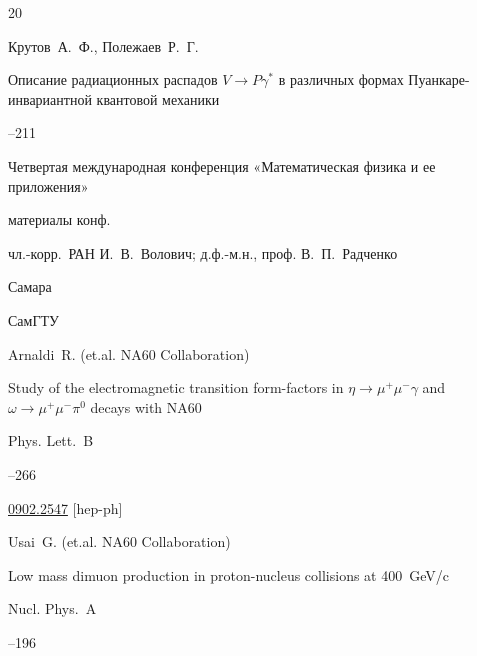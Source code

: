 \begin{thebibliography}{20}




\by  Крутов~А.~Ф., Полежаев~Р.~Г.

\paper Описание радиационных распадов $V \to  P\gamma^{*}$ в различных формах Пуанкаре-инвариантной квантовой механики

--211

\inbook Четвертая международная конференция «Математическая физика и ее приложения»

\bookinfo материалы конф. 

\eds чл.-корр.~РАН И.~В.~Волович; д.ф.-м.н., проф. В.~П.~Радченко

\publaddr Самара

\publ СамГТУ









\by Arnaldi~R. (et.al. NA60 Collaboration)

\paper Study of the electromagnetic transition form-factors in $\eta\to \mu^{+}\mu^{-}\gamma$ and $\omega\to \mu^{+}\mu^{-}\pi^{0}$ decays with NA60

\jour Phys. Lett.~B



--266



\arxiv \href{http://arxiv.org/abs/0902.2547}{0902.2547} [hep-ph]




\by Usai~G. (et.al. NA60 Collaboration)

\paper Low mass dimuon production in proton-nucleus collisions at 400~GeV/c

\jour Nucl. Phys.~A




--196






\end{thebibliography}

